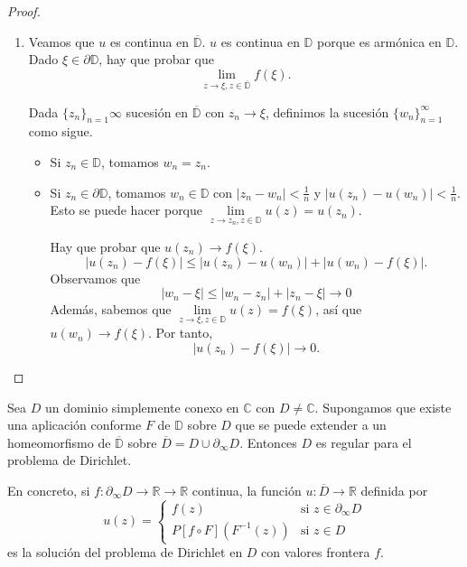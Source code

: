 \begin{proof}
\begin{enumerate}
        \item Veamos que $u$ es continua en $\overline{\mathbb{D}}$.
              $u$ es continua en $\mathbb{D}$ porque es armónica en $\mathbb{D}$.
              Dado $\xi \in \partial\mathbb{D}$, hay que probar que
              $$\lim_{z \to \xi, z \in \overline{\mathbb{D}}} f(\xi).$$

              Dada $\{z_n\}_{n=1}\infty$ sucesión en $\overline{\mathbb{D}}$ con $z_n \to \xi$, definimos la sucesión $\{w_n\}_{n=1}^\infty$ como sigue.
              \begin{itemize}
                  \item Si $z_n \in \mathbb{D}$, tomamos $w_n = z_n$.
                  \item Si $z_n \in \partial\mathbb{D}$, tomamos $w_n \in \mathbb{D}$ con $|z_n-w_n| < \frac{1}{n}$ y $|u(z_n)-u(w_n)| < \frac{1}{n}$.
                        Esto se puede hacer porque $\lim\limits_{z \to z_n, z \in \mathbb{D}} u(z) = u(z_n)$.

                        Hay que probar que $u(z_n) \to f(\xi)$.
                        $$|u(z_n)-f(\xi)| \leq |u(z_n)-u(w_n)| + |u(w_n)-f(\xi)|.$$
                        Observamos que
                        $$|w_n-\xi| \leq |w_n-z_n| + |z_n-\xi| \to 0$$
                        Además, sabemos que $\lim\limits_{z \to \xi, z \in \mathbb{D}} u(z) = f(\xi)$, así que $u(w_n) \to f(\xi)$.
                        Por tanto,
                        $$|u(z_n) - f(\xi)| \to 0.$$
              \end{itemize}
    \end{enumerate}
\end{proof}

\begin{theorem}
    Sea $D$ un dominio simplemente conexo en $\mathbb{C}$ con $D \neq \mathbb{C}$.
    Supongamos que existe una aplicación conforme $F$ de $\mathbb{D}$ sobre $D$ que se puede extender a un homeomorfismo de $\overline{\mathbb{D}}$ sobre $\overline{D} = D \cup \partial_\infty D$.
    Entonces $D$ es regular para el problema de Dirichlet.

    En concreto, si $f: \partial_\infty D \to \mathbb{R} \to \mathbb{R}$ continua, la función $u: \overline{D} \to \mathbb{R}$ definida por
    $$u(z) = \begin{cases}
            f(z)                    & \text{si } z \in \partial_\infty D \\
            P[f \circ F](F^{-1}(z)) & \text{si } z \in D
        \end{cases}$$
    es la solución del problema de Dirichlet en $D$ con valores frontera $f$.
\end{theorem}

